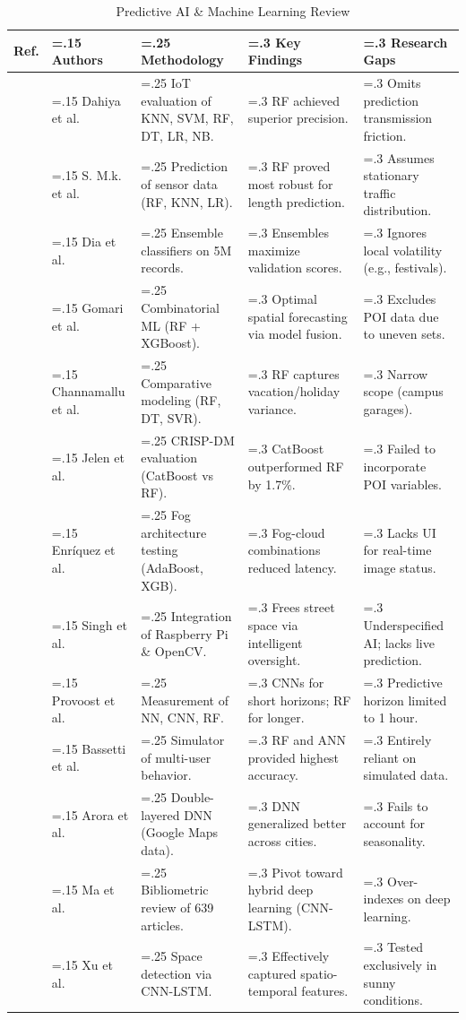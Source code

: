 \documentclass[conference]{IEEEtran}
\begin{document}
\begin{table}[!htbp]
\caption{Predictive AI \& Machine Learning Review}
\label{tab:ai_ml}
\centering
\begin{tabularx}{\textwidth}{@{} l >{\hsize=.15\hsize}X >{\hsize=.25\hsize}X >{\hsize=.3\hsize}X >{\hsize=.3\hsize}X @{}}
\toprule
\textbf{Ref.} & \textbf{Authors} & \textbf{Methodology} & \textbf{Key Findings} & \textbf{Research Gaps} \\
\midrule
\cite{b21} & Dahiya et al. & IoT evaluation of KNN, SVM, RF, DT, LR, NB. & RF achieved superior precision. & Omits prediction transmission friction. \\
\cite{b6} & S. M.k. et al. & Prediction of sensor data (RF, KNN, LR). & RF proved most robust for length prediction. & Assumes stationary traffic distribution. \\
\cite{b29} & Dia et al. & Ensemble classifiers on 5M records. & Ensembles maximize validation scores. & Ignores local volatility (e.g., festivals). \\
\cite{b12} & Gomari et al. & Combinatorial ML (RF + XGBoost). & Optimal spatial forecasting via model fusion. & Excludes POI data due to uneven sets. \\
\cite{b14} & Channamallu et al. & Comparative modeling (RF, DT, SVR). & RF captures vacation/holiday variance. & Narrow scope (campus garages). \\
\cite{b10} & Jelen et al. & CRISP-DM evaluation (CatBoost vs RF). & CatBoost outperformed RF by 1.7\%. & Failed to incorporate POI variables. \\
\cite{b35} & Enríquez et al. & Fog architecture testing (AdaBoost, XGB). & Fog-cloud combinations reduced latency. & Lacks UI for real-time image status. \\
\cite{b28} & Singh et al. & Integration of Raspberry Pi \& OpenCV. & Frees street space via intelligent oversight. & Underspecified AI; lacks live prediction. \\
\cite{b30} & Provoost et al. & Measurement of NN, CNN, RF. & CNNs for short horizons; RF for longer. & Predictive horizon limited to 1 hour. \\
\cite{b16} & Bassetti et al. & Simulator of multi-user behavior. & RF and ANN provided highest accuracy. & Entirely reliant on simulated data. \\
\cite{b18} & Arora et al. & Double-layered DNN (Google Maps data). & DNN generalized better across cities. & Fails to account for seasonality. \\
\cite{b5} & Ma et al. & Bibliometric review of 639 articles. & Pivot toward hybrid deep learning (CNN-LSTM). & Over-indexes on deep learning. \\
\cite{b32} & Xu et al. & Space detection via CNN-LSTM. & Effectively captured spatio-temporal features. & Tested exclusively in sunny conditions. \\
\bottomrule
\end{tabularx}
\end{table}
\end{document}
